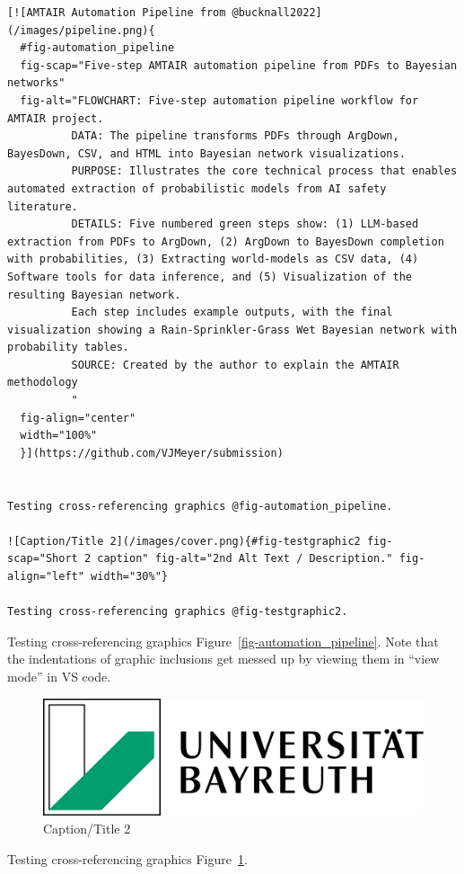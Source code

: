 \documentclass[
  11pt,
  letterpaper,
]{book}
\begin{document}
\begin{verbatim}
[![AMTAIR Automation Pipeline from @bucknall2022](/images/pipeline.png){
  #fig-automation_pipeline
  fig-scap="Five-step AMTAIR automation pipeline from PDFs to Bayesian networks" 
  fig-alt="FLOWCHART: Five-step automation pipeline workflow for AMTAIR project.
          DATA: The pipeline transforms PDFs through ArgDown, BayesDown, CSV, and HTML into Bayesian network visualizations.
          PURPOSE: Illustrates the core technical process that enables automated extraction of probabilistic models from AI safety literature.
          DETAILS: Five numbered green steps show: (1) LLM-based extraction from PDFs to ArgDown, (2) ArgDown to BayesDown completion with probabilities, (3) Extracting world-models as CSV data, (4) Software tools for data inference, and (5) Visualization of the resulting Bayesian network.
          Each step includes example outputs, with the final visualization showing a Rain-Sprinkler-Grass Wet Bayesian network with probability tables.
          SOURCE: Created by the author to explain the AMTAIR methodology
          "
  fig-align="center" 
  width="100%"
  }](https://github.com/VJMeyer/submission)


Testing cross-referencing graphics @fig-automation_pipeline.

![Caption/Title 2](/images/cover.png){#fig-testgraphic2 fig-scap="Short 2 caption" fig-alt="2nd Alt Text / Description." fig-align="left" width="30%"}

Testing cross-referencing graphics @fig-testgraphic2.
\end{verbatim}

Testing cross-referencing graphics Figure~\ref{fig-automation_pipeline}.
Note that the indentations of graphic inclusions get messed up by
viewing them in ``view mode'' in VS code.

\begin{figure}

\includegraphics[width=0.3\linewidth,height=\textheight,keepaspectratio]{images/cover.png}

\caption[Short 2 caption]{\label{fig-testgraphic2}Caption/Title 2}

\end{figure}%

Testing cross-referencing graphics Figure~\ref{fig-testgraphic2}.
\end{document}
